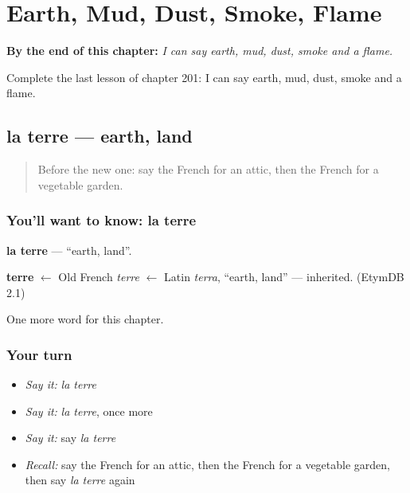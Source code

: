 
\chapter{Earth, Mud, Dust, Smoke, Flame}
\label{ch:fr-earth-mud-dust-smoke-flame}

\begin{chapteropening}
\textbf{By the end of this chapter:} \emph{I can say earth, mud, dust, smoke and a flame.}

Complete the last lesson of chapter 201: I can say earth, mud, dust, smoke and a flame.
\end{chapteropening}

\section[la terre]{la terre — earth, land}

\label{lesson:FR-C201-terre}



\begin{quote}
Before the new one: say the French for an attic, then the French for a vegetable garden.
\end{quote}

\subsection*{You'll want to know: la terre}
\textbf{la terre} — \textquotedblleft{}earth, land\textquotedblright{}.

\begin{cousinweb}
\textbf{terre} $\leftarrow$ Old French \emph{terre} $\leftarrow$ Latin \emph{terra}, \textquotedblleft{}earth, land\textquotedblright{} — inherited. (EtymDB 2.1)
\end{cousinweb}

\begin{grammarlens}[title={What you've built}]
One more word for this chapter.
\end{grammarlens}

\subsection*{Your turn}
\begin{itemize}
\raggedright
  \item \emph{Say it:} \emph{la terre}
  \item \emph{Say it:} \emph{la terre}, once more
  \item \emph{Say it:} say \emph{la terre}
  \item \emph{Recall:} say the French for an attic, then the French for a vegetable garden, then say \emph{la terre} again
\end{itemize}


